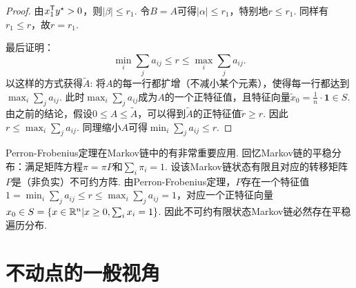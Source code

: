 \begin{proof}
由$x_1^{\mathsf{T}} y^\star>0$，则$|\beta|\le r_1$. 令$B=A$可得$|\alpha|\le r_1$，特别地$r\le r_1$. 同样有$r_1\le r$，故$r=r_1$. 

最后证明：
\[\min_i\sum_j a_{ij}\le r\le \max_i\sum_j a_{ij}.\]
以这样的方式获得$\tilde A$: 将$A$的每一行都扩增（不减小某个元素），使得每一行都达到$\max_i\sum_j a_{ij}$. 此时$\max_i\sum_j a_{ij}$成为$A$的一个正特征值，且特征向量$\tilde{x}_0=\frac 1n\cdot\mathbf{1}\in S$. 由之前的结论，假设$0\le A\le \tilde A$，可以得到$\tilde A$的正特征值$\tilde r\ge r$. 因此$r \le \max_i\sum_j a_{ij}$. 同理缩小$A$可得$\min_i\sum_j a_{ij}\le r$.
\end{proof}

Perron-Frobenius定理在Markov链中的有非常重要应用. 回忆Markov链的平稳分布：满足矩阵方程$\pi = \pi P$和$\sum_i\pi_i=1$.  设该Markov链状态有限且对应的转移矩阵$P$是（非负实）不可约方阵. 由Perron-Frobenius定理，$P$存在一个特征值$1=\min_i\sum_ja_{ij}\le r\le\max_i\sum_j a_{ij}=1$，对应一个正特征向量$x_0\in S=\{x\in\mathbb{R}^n|x\ge 0,\sum_ix_i=1\}$. 因此不可约有限状态Markov链必然存在平稳遍历分布.


\section{不动点的一般视角}
    